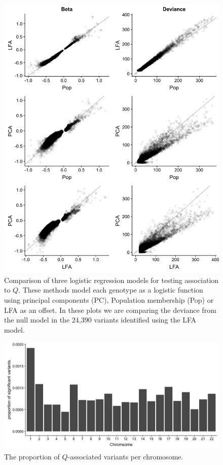 \documentclass[9pt,lineno]{elife}
\begin{document}
\begin{figure}[h]
\centering
\includegraphics[width=15cm,keepaspectratio]{./Figures/fits_Significant_Positions_CompareModels.jpg}
\caption{Comparison of three logistic regression models for testing association to $Q$.
These methods model each genotype as a logistic function using principal components (PC), Population membership (Pop) or LFA as an offset.
In these plots we are comparing the deviance from the null model in the 24,390 variants identified using the LFA model.}  
\label{CompareModel}
\end{figure}

\begin{figure}[h]
\centering
\includegraphics[width=15cm,keepaspectratio]{./Figures/CountPerChrom.jpg}
\caption{The proportion of $Q$-associated variants per chromosome.}  
\label{CountPerChrom}
\end{figure}
\end{document}
